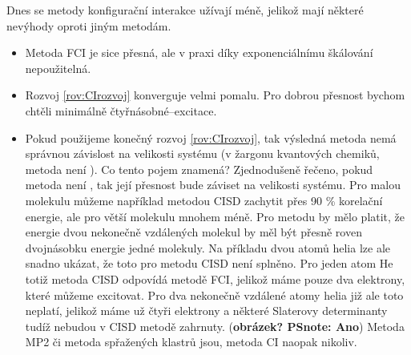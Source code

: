 Dnes se metody konfigurační interakce užívají méně, jelikož mají některé nevýhody oproti jiným metodám. 
\begin{itemize}
\item Metoda FCI je sice přesná, ale v praxi díky exponenciálnímu škálování nepoužitelná.
\item Rozvoj \ref{rov:CIrozvoj} konverguje velmi pomalu. Pro dobrou přesnost bychom chtěli minimálně čtyřnásobné--excitace.
\item Pokud použijeme konečný rozvoj \ref{rov:CIrozvoj}, tak výsledná metoda nemá správnou závislost na velikosti systému (v žargonu kvantových chemiků, metoda není ). Co tento pojem znamená? Zjednodušeně řečeno, pokud metoda není , tak její přesnost bude záviset na velikosti systému. Pro malou molekulu můžeme například metodou CISD zachytit přes 90 \% korelační energie, ale pro větší molekulu mnohem méně. Pro  metodu by mělo platit, že energie dvou nekonečně vzdálených molekul by měl být přesně roven dvojnásobku energie jedné molekuly. Na příkladu dvou atomů helia lze ale snadno ukázat, že toto pro metodu CISD není splněno. Pro jeden atom He totiž metoda CISD odpovídá metodě FCI, jelikož máme pouze dva elektrony, které můžeme excitovat. Pro dva nekonečně vzdálené atomy helia již ale toto neplatí, jelikož máme už čtyři elektrony a některé Slaterovy determinanty tudíž nebudou v CISD metodě zahrnuty. (\textbf{obrázek? PSnote: Ano}) Metoda MP2 či metoda spřažených klastrů  jsou, metoda CI naopak nikoliv. 
\end{itemize}



